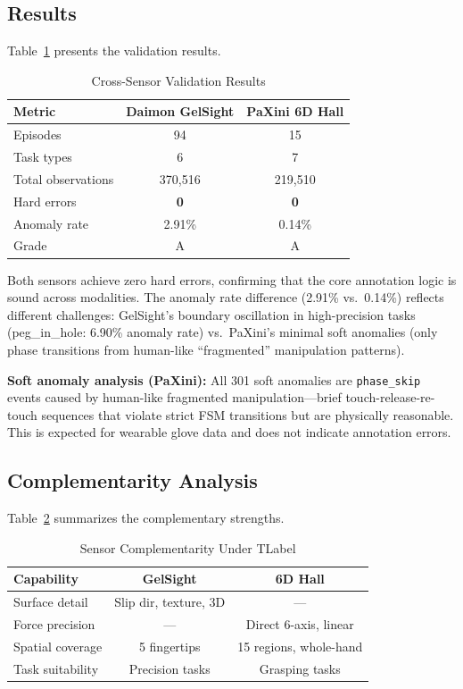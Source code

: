 \documentclass[conference]{IEEEtran}
\begin{document}
\subsection{Results}

Table~\ref{tab:results} presents the validation results.

\begin{table}[t]
\centering
\caption{Cross-Sensor Validation Results}
\label{tab:results}
\begin{tabular}{lcc}
\toprule
\textbf{Metric} & \textbf{Daimon GelSight} & \textbf{PaXini 6D Hall} \\
\midrule
Episodes & 94 & 15 \\
Task types & 6 & 7 \\
Total observations & 370,516 & 219,510 \\
Hard errors & \textbf{0} & \textbf{0} \\
Anomaly rate & 2.91\% & 0.14\% \\
Grade & A & A \\
\bottomrule
\end{tabular}
\end{table}

Both sensors achieve zero hard errors, confirming that the core annotation logic is sound across modalities. The anomaly rate difference (2.91\% vs.\ 0.14\%) reflects different challenges: GelSight's boundary oscillation in high-precision tasks (peg\_in\_hole: 6.90\% anomaly rate) vs.\ PaXini's minimal soft anomalies (only phase transitions from human-like ``fragmented'' manipulation patterns).

\textbf{Soft anomaly analysis (PaXini):} All 301 soft anomalies are \texttt{phase\_skip} events caused by human-like fragmented manipulation---brief touch-release-re-touch sequences that violate strict FSM transitions but are physically reasonable. This is expected for wearable glove data and does not indicate annotation errors.

\subsection{Complementarity Analysis}

Table~\ref{tab:complementarity} summarizes the complementary strengths.

\begin{table}[t]
\centering
\caption{Sensor Complementarity Under TLabel}
\label{tab:complementarity}
\begin{tabular}{lcc}
\toprule
\textbf{Capability} & \textbf{GelSight} & \textbf{6D Hall} \\
\midrule
Surface detail & Slip dir, texture, 3D & --- \\
Force precision & --- & Direct 6-axis, linear \\
Spatial coverage & 5 fingertips & 15 regions, whole-hand \\
Task suitability & Precision tasks & Grasping tasks \\
\bottomrule
\end{tabular}
\end{table}
\end{document}
